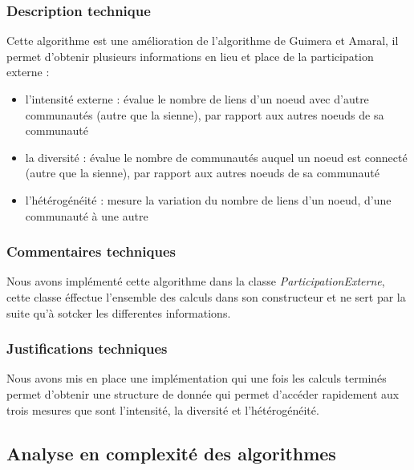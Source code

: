 \begin{titlepage}
{\subsubsection{Description technique}
{
Cette algorithme est une amélioration de l'algorithme de Guimera et Amaral, il permet d'obtenir plusieurs informations en lieu et place de la participation externe :
}
\begin{itemize}
    \item l'intensité externe : évalue le nombre de liens d'un noeud avec d'autre communautés (autre que la sienne), par rapport aux autres noeuds de sa communauté
    \item la diversité : évalue le nombre de communautés auquel un noeud est connecté (autre que la sienne), par rapport aux autres noeuds de sa communauté
    \item l'hétérogénéité : mesure la variation du nombre de liens d'un noeud, d'une communauté à une autre
\end{itemize}
\subsubsection{Commentaires techniques}
{
Nous avons implémenté cette algorithme dans la classe \textit{ParticipationExterne}, cette classe éffectue l'ensemble des calculs dans son constructeur et ne sert par la suite qu'à sotcker les differentes informations.
}
\subsubsection{Justifications techniques}
{
Nous avons mis en place une implémentation qui une fois les calculs terminés permet d'obtenir une structure de donnée qui permet d'accéder rapidement aux trois mesures que sont l'intensité, la diversité et l'hétérogénéité.}
}


\newpage
\begin{center}
\begin{bf}
\section{Analyse en complexité des algorithmes}
\end{bf}
\end{center}


\end{titlepage}
